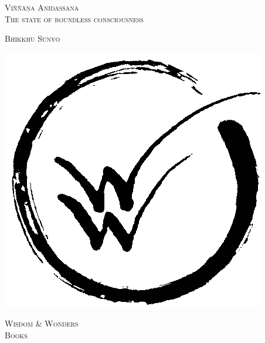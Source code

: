 \documentclass[10pt, openany]{book}
\begin{document}
\begin{center}
\vspace{2em}

\Huge\Titlefont\scshape{Viññāṇa Anidassana}\\
\vspace{0.5em}
\large\Titlefont\scshape{The state of boundless consciousness}\\

\begin{Large}
\vspace{4em}
\Titlefont\scshape{Bhikkhu Sunyo}
\end{Large}


\vspace*{\fill}
\includegraphics[scale=0.06, trim = 0 13 5 0 ]{../_resources/images/icons/logo-enso-large}\\
\vspace{4pt}
\begin{small}
\scshape{Wisdom \& Wonders\\
Books}
\end{small}
\end{center}
\end{document}
